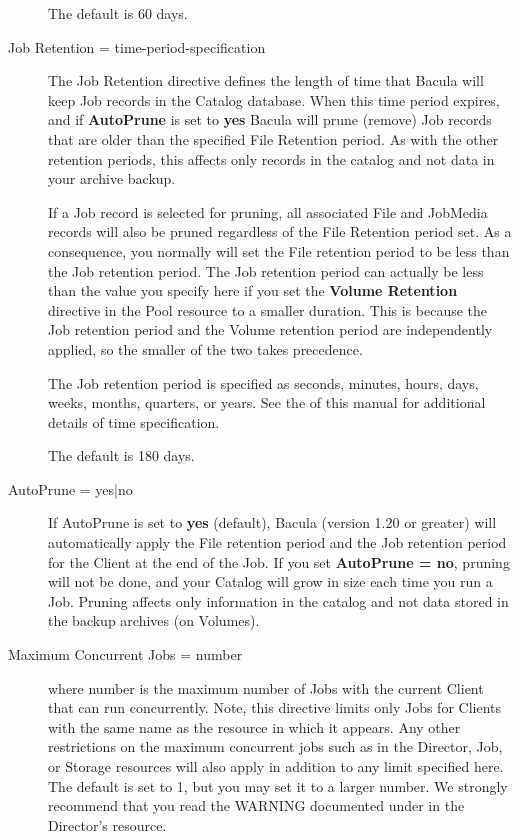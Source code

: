 \begin{description}
The  default is 60 days. 
\label{JobRetention}

\item [Job Retention = \lt{}time-period-specification\gt{}]
   The Job Retention directive defines the length of time that  Bacula will keep
Job records in the Catalog database.  When this time period expires, and if
{\bf AutoPrune} is set to  {\bf yes} Bacula will prune (remove) Job records
that are  older than the specified File Retention period. As with the other 
retention periods, this affects only records in the catalog and  not data in
your archive backup.  

If a Job  record is selected for pruning, all associated File and JobMedia 
records will also be pruned regardless of the File Retention  period set. As a
consequence, you normally will set the File  retention period to be less than
the Job retention period. The  Job retention period can actually be less than
the value you  specify here if you set the {\bf Volume Retention} directive in
the  Pool resource to a smaller duration. This is because the Job  retention
period and the Volume retention period are  independently applied, so the
smaller of the two takes  precedence.  

The Job retention period is specified as seconds,  minutes, hours, days,
weeks, months,  quarters, or years.  See the 
 of this manual for
additional details of  time specification.  

The default is 180 days.  
\label{AutoPrune}

\item [AutoPrune = \lt{}yes|no\gt{}]
   If AutoPrune is set to  {\bf yes} (default), Bacula (version 1.20 or greater)
will  automatically apply the File retention period and the Job  retention
period for the Client at the end of the Job.  If you set {\bf AutoPrune = no},
pruning will not be done,  and your Catalog will grow in size each time you
run a Job.  Pruning affects only information in the catalog and not data 
stored in the backup archives (on Volumes).  

\item [Maximum Concurrent Jobs = \lt{}number\gt{}]
   where \lt{}number\gt{}  is the maximum number of Jobs with the current Client
that  can run concurrently. Note, this directive limits only Jobs  for Clients
with the same name as the resource in which it appears. Any  other
restrictions on the maximum concurrent jobs such as in  the Director, Job, or
Storage resources will also apply in addition to  any limit specified here.
The  default is set to 1, but you may set it to a larger number.  We strongly
recommend that you read the WARNING documented under  
 in the Director's
resource.  


\end{description}
